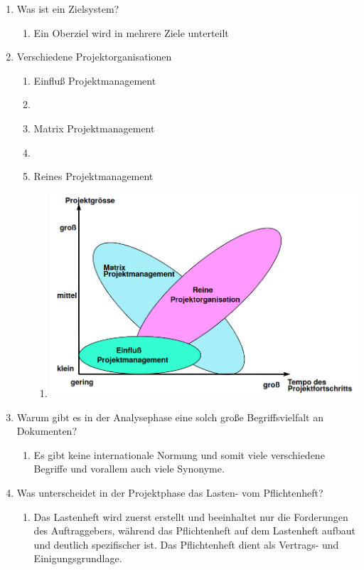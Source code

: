 \documentclass[12pt,a4paper]{article}
\begin{document}
\begin{enumerate}
\begin{enumerate}
		\end{enumerate}
	\item Was ist ein Zielsystem?
		\begin{enumerate}
		\item[] Ein Oberziel wird in mehrere Ziele unterteilt
		\end{enumerate}
	\item Verschiedene Projektorganisationen
	\begin{enumerate}
		\item[] Einfluß Projektmanagement
		\item[] 
		\item[] Matrix Projektmanagement
		\item[] 
		\item[] Reines Projektmanagement
		\begin{enumerate}
			\item[] \includegraphics[scale=0.6]{Bilder/projektorganisationenWirksamkeit.PNG}
		\end{enumerate}
	\end{enumerate}
	\item Warum gibt es in der Analysephase eine solch große Begriffsvielfalt an Dokumenten?
	\begin{enumerate}
		\item Es gibt keine internationale Normung und somit viele verschiedene Begriffe und vorallem auch viele Synonyme.
	\end{enumerate}
	\item Was unterscheidet in der Projektphase das Lasten- vom Pflichtenheft?
	\begin{enumerate}
		\item Das Lastenheft wird zuerst erstellt und beeinhaltet nur die Forderungen des Auftraggebers, während das Pflichtenheft auf dem Lastenheft aufbaut und deutlich spezifischer ist. Das Pflichtenheft dient als Vertrags- und Einigungsgrundlage.

\end{enumerate}
\end{enumerate}
\end{document}
